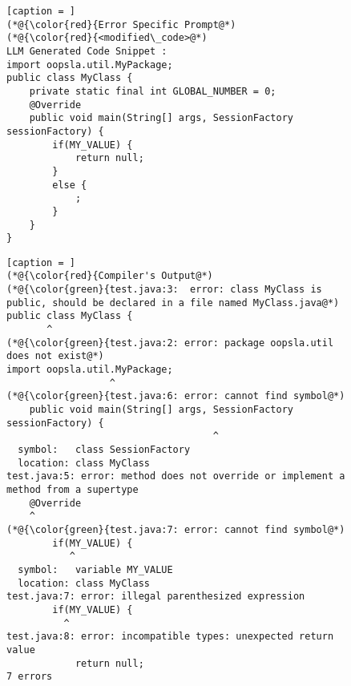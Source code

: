 \begin{figure}[t]
	\centering
\begin{minipage}{0.45\textwidth}        
\begin{lstlisting}[caption = ]
(*@{\color{red}{Error Specific Prompt@*)
(*@{\color{red}{<modified\_code>@*)
LLM Generated Code Snippet : 
import oopsla.util.MyPackage;
public class MyClass {
    private static final int GLOBAL_NUMBER = 0;
    @Override
    public void main(String[] args, SessionFactory sessionFactory) {
        if(MY_VALUE) {
            return null;
        }
        else {
            ;
        }
    }
}

\end{lstlisting}
\end{minipage}
\begin{minipage}{0.45\textwidth}        
\begin{lstlisting}[caption = ]
(*@{\color{red}{Compiler's Output@*)
(*@{\color{green}{test.java:3:  error: class MyClass is public, should be declared in a file named MyClass.java@*)
public class MyClass {
       ^ 
(*@{\color{green}{test.java:2: error: package oopsla.util does not exist@*)
import oopsla.util.MyPackage;
                  ^
(*@{\color{green}{test.java:6: error: cannot find symbol@*)
    public void main(String[] args, SessionFactory sessionFactory) {
                                    ^
  symbol:   class SessionFactory
  location: class MyClass
test.java:5: error: method does not override or implement a method from a supertype
    @Override
    ^
(*@{\color{green}{test.java:7: error: cannot find symbol@*)
        if(MY_VALUE) {
           ^
  symbol:   variable MY_VALUE
  location: class MyClass
test.java:7: error: illegal parenthesized expression
        if(MY_VALUE) {
          ^
test.java:8: error: incompatible types: unexpected return value
            return null;
7 errors


\end{lstlisting}
\end{minipage}
\end{figure}
